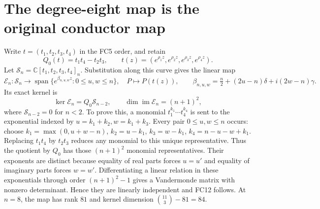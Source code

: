 \documentclass[11pt]{article}
\newcommand{\C}{\mathbb C}
\begin{document}
\section{The degree-eight map is the original conductor map}
Write $t=(t_1,t_2,t_3,t_4)$ in the FC5 order, and retain
\[
 Q_0(t)=t_1t_4-t_2t_3,\qquad
 t(z)=(e^{\rho_1z},e^{\rho_2z},e^{\rho_3z},e^{\rho_4z}).
 \tag{FC10}
\]
Let $\mathcal S_n=\C[t_1,t_2,t_3,t_4]_n$. Substitution along this
curve gives the linear map
\[
 \mathcal E_n:\mathcal S_n\to
 \operatorname{span}\{e^{\beta_{n,u,w}z}:0\le u,w\le n\},
 \quad P\mapsto P(t(z)),\qquad
 \beta_{n,u,w}=\tfrac n2+(2u-n)\delta+i(2w-n)\gamma.
 \tag{FC11}
\]
Its exact kernel is
\[
 \ker\mathcal E_n=Q_0\mathcal S_{n-2},\qquad
 \dim\operatorname{im}\mathcal E_n=(n+1)^2,
 \tag{FC12}
\]
where $\mathcal S_{n-2}=0$ for $n<2$.
To prove this, a monomial $t_1^{k_1}\cdots t_4^{k_4}$ is sent to the
exponential indexed by $u=k_1+k_2,w=k_1+k_3$. Every pair $0\le u,w\le n$
occurs: choose
$k_1=\max(0,u+w-n)$, $k_2=u-k_1$, $k_3=w-k_1$,
$k_4=n-u-w+k_1$. Replacing $t_1t_4$ by $t_2t_3$ reduces any monomial to
this unique representative. Thus the quotient by $Q_0$ has those
$(n+1)^2$ monomial representatives. Their exponents are distinct because
equality of real parts forces $u=u'$ and equality of imaginary parts
forces $w=w'$. Differentiating a linear relation in these exponentials
through order $(n+1)^2-1$ gives a Vandermonde matrix with nonzero
determinant. Hence they are linearly independent and FC12 follows.
At $n=8$, the map has rank $81$ and kernel dimension
$\binom{11}{3}-81=84$.
\end{document}
